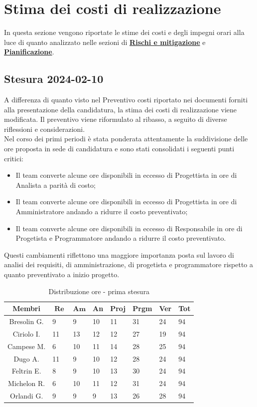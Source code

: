 \documentclass[10pt, a4paper]{article}
\begin{document}
{{{{{{\section{Stima dei costi di realizzazione}
In questa sezione vengono riportate le stime dei costi e degli impegni orari alla luce di quanto analizzato nelle sezioni di \hyperref[section:Rischi]{\textbf{Rischi e mitigazione}} e \hyperref[section:Pianificazione]{\textbf{Pianificazione}}.

\subsection{Stesura 2024-02-10}
A differenza di quanto visto nel Preventivo costi riportato nei documenti forniti alla presentazione della candidatura, la stima dei costi di realizzazione viene modificata. Il preventivo viene riformulato al ribasso, a seguito di diverse riflessioni e considerazioni. \\ Nel corso dei primi periodi è stata ponderata attentamente la suddivisione delle ore proposta in sede di candidatura e sono stati consolidati i seguenti punti critici:
\begin{itemize}
    \item Il team converte alcune ore disponibili in eccesso di Progettista in ore di Analista a parità di costo;
    \item Il team converte alcune ore disponibili in eccesso di Progettista in ore di Amministratore andando a ridurre il costo preventivato;
    \item Il team converte alcune ore disponibili in eccesso di Responsabile in ore di Progetista e Programmatore andando a ridurre il costo preventivato.
\end{itemize}
Questi cambiamenti riflettono una maggiore importanza posta sul lavoro di analisi dei requisiti, di amministrazione, di progetista e programmatore rispetto a quanto preventivato a inizio progetto.\\


{\renewcommand{\arraystretch}{1.2}
\begin{table}[H]
\begin{tabularx}{\textwidth}{c|X|X|X|X|X|X|X}
        \textbf{Membri} & $\operatorname{\textbf{Re}}$ & $\mathrm{\textbf{Am}}$ & \textbf{An} & \textbf{Proj} & \textbf{Prgm} & \textbf{Ver} & \textbf{Tot} \\
        \hline Bresolin G. & 9 & 9 & 10 & 11 & 31 & 24 & 94 \\
        \hline Ciriolo I. & 11 & 13 & 12 & 12 & 27 & 19 & 94 \\
        \hline Campese M. & 6 & 10 & 11 & 14 & 28 & 25 & 94 \\
        \hline Dugo A.   & 11 & 9 & 10 & 12 & 28 & 24 & 94 \\
        \hline Feltrin E. & 8 & 9 & 10 & 13 & 30 & 24 & 94 \\
        \hline Michelon R. & 6 & 10 & 11 & 12 & 31 & 24 & 94 \\
        \hline Orlandi G. & 9 & 9 & 9 & 13 & 26 & 28 & 94 
    \end{tabularx}
    \caption{Distribuzione ore - prima stesura}
    \end{table}

}}}}}}}
\end{document}
